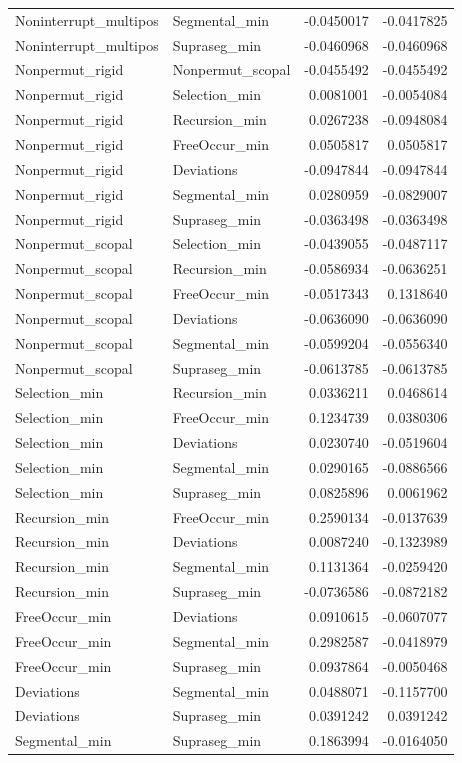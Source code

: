 \documentclass[
]{article}
\begin{document}
\begin{longtable}[]{@{}llrr@{}}
Noninterrupt\_multipos & Segmental\_min & -0.0450017 & -0.0417825 \\
Noninterrupt\_multipos & Supraseg\_min & -0.0460968 & -0.0460968 \\
Nonpermut\_rigid & Nonpermut\_scopal & -0.0455492 & -0.0455492 \\
Nonpermut\_rigid & Selection\_min & 0.0081001 & -0.0054084 \\
Nonpermut\_rigid & Recursion\_min & 0.0267238 & -0.0948084 \\
Nonpermut\_rigid & FreeOccur\_min & 0.0505817 & 0.0505817 \\
Nonpermut\_rigid & Deviations & -0.0947844 & -0.0947844 \\
Nonpermut\_rigid & Segmental\_min & 0.0280959 & -0.0829007 \\
Nonpermut\_rigid & Supraseg\_min & -0.0363498 & -0.0363498 \\
Nonpermut\_scopal & Selection\_min & -0.0439055 & -0.0487117 \\
Nonpermut\_scopal & Recursion\_min & -0.0586934 & -0.0636251 \\
Nonpermut\_scopal & FreeOccur\_min & -0.0517343 & 0.1318640 \\
Nonpermut\_scopal & Deviations & -0.0636090 & -0.0636090 \\
Nonpermut\_scopal & Segmental\_min & -0.0599204 & -0.0556340 \\
Nonpermut\_scopal & Supraseg\_min & -0.0613785 & -0.0613785 \\
Selection\_min & Recursion\_min & 0.0336211 & 0.0468614 \\
Selection\_min & FreeOccur\_min & 0.1234739 & 0.0380306 \\
Selection\_min & Deviations & 0.0230740 & -0.0519604 \\
Selection\_min & Segmental\_min & 0.0290165 & -0.0886566 \\
Selection\_min & Supraseg\_min & 0.0825896 & 0.0061962 \\
Recursion\_min & FreeOccur\_min & 0.2590134 & -0.0137639 \\
Recursion\_min & Deviations & 0.0087240 & -0.1323989 \\
Recursion\_min & Segmental\_min & 0.1131364 & -0.0259420 \\
Recursion\_min & Supraseg\_min & -0.0736586 & -0.0872182 \\
FreeOccur\_min & Deviations & 0.0910615 & -0.0607077 \\
FreeOccur\_min & Segmental\_min & 0.2982587 & -0.0418979 \\
FreeOccur\_min & Supraseg\_min & 0.0937864 & -0.0050468 \\
Deviations & Segmental\_min & 0.0488071 & -0.1157700 \\
Deviations & Supraseg\_min & 0.0391242 & 0.0391242 \\
Segmental\_min & Supraseg\_min & 0.1863994 & -0.0164050 \\
\end{longtable}
\end{document}
